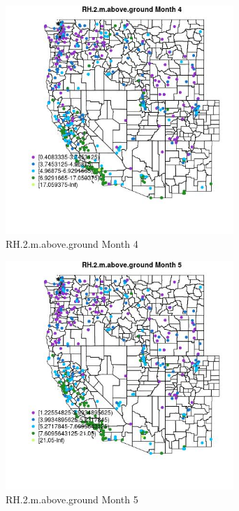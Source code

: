 \begin{figure} 
\centering  
\includegraphics[width=0.77\textwidth]{Code_Outputs/ML_input_report_ML_input_PM25_Step5_part_d_de_duplicated_aves_ML_input_MapObsMo4RH2maboveground.jpg} 
\caption{\label{fig:ML_input_report_ML_input_PM25_Step5_part_d_de_duplicated_aves_ML_inputMapObsMo4RH2maboveground}RH.2.m.above.ground Month 4} 
\end{figure} 
 

\begin{figure} 
\centering  
\includegraphics[width=0.77\textwidth]{Code_Outputs/ML_input_report_ML_input_PM25_Step5_part_d_de_duplicated_aves_ML_input_MapObsMo5RH2maboveground.jpg} 
\caption{\label{fig:ML_input_report_ML_input_PM25_Step5_part_d_de_duplicated_aves_ML_inputMapObsMo5RH2maboveground}RH.2.m.above.ground Month 5} 
\end{figure} 
 

